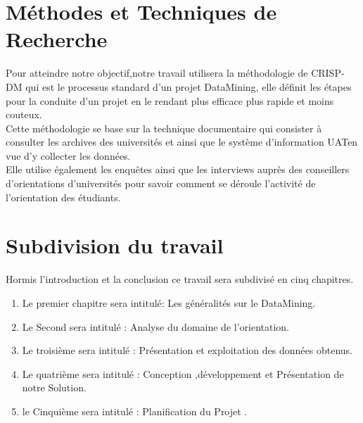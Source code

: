 \section{Méthodes et Techniques de Recherche}
Pour atteindre notre objectif,notre  travail utilisera la méthodologie de \ac{CRISP-DM} qui est le processus standard d’un projet DataMining, elle définit les étapes pour la conduite d’un projet en le rendant plus efficace plus rapide et moins couteux. \cite{DMProces}  \\
Cette méthodologie se base sur la technique documentaire qui consister à consulter les archives des universités et ainsi que le système d'information \ac{UAT}en vue d'y collecter les données. \\
Elle utilise également les enquêtes ainsi que les interviews auprès des conseillers d'orientations d'universités pour savoir comment se déroule l'activité de l'orientation des étudiants.
\section{Subdivision du travail}
Hormis l'introduction et la conclusion ce travail sera subdivisé en cinq chapitres.  
\begin{enumerate}
	\item Le premier chapitre sera intitulé: Les généralités sur le DataMining.
	\item Le Second sera intitulé : Analyse du domaine de l'orientation.
	\item Le troisième sera intitulé : Présentation et exploitation des données obtenus. 
	\item Le quatrième sera intitulé : Conception ,développement et Présentation de notre Solution.
	\item le Cinquième sera intitulé : Planification du Projet .
\end{enumerate}
